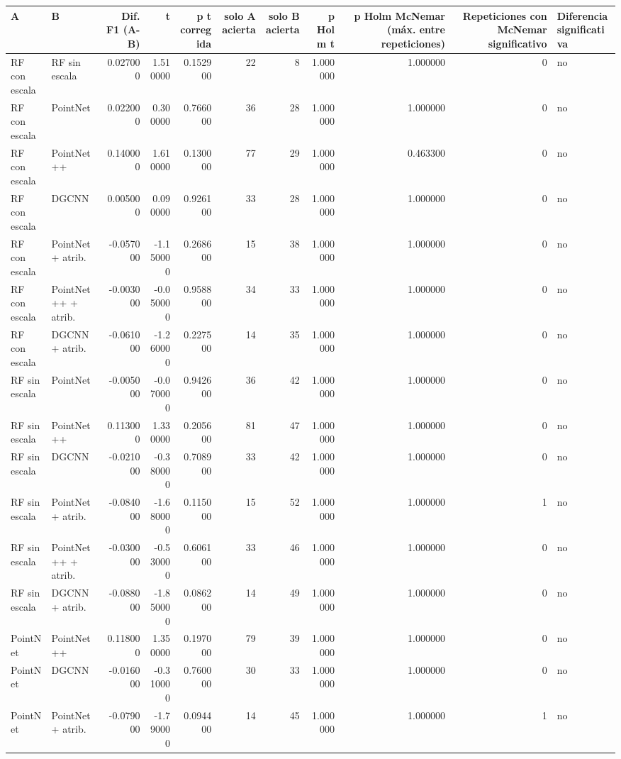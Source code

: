 \begin{tabular}{llrrrrrrrrl}
\toprule
A & B & Dif. F1 (A-B) & t & p t corregida & solo A acierta & solo B acierta & p Holm t & p Holm McNemar (máx. entre repeticiones) & Repeticiones con McNemar significativo & Diferencia significativa \\
\midrule
RF con escala & RF sin escala & 0.027000 & 1.510000 & 0.152900 & 22 & 8 & 1.000000 & 1.000000 & 0 & no \\
RF con escala & PointNet & 0.022000 & 0.300000 & 0.766000 & 36 & 28 & 1.000000 & 1.000000 & 0 & no \\
RF con escala & PointNet++ & 0.140000 & 1.610000 & 0.130000 & 77 & 29 & 1.000000 & 0.463300 & 0 & no \\
RF con escala & DGCNN & 0.005000 & 0.090000 & 0.926100 & 33 & 28 & 1.000000 & 1.000000 & 0 & no \\
RF con escala & PointNet + atrib. & -0.057000 & -1.150000 & 0.268600 & 15 & 38 & 1.000000 & 1.000000 & 0 & no \\
RF con escala & PointNet++ + atrib. & -0.003000 & -0.050000 & 0.958800 & 34 & 33 & 1.000000 & 1.000000 & 0 & no \\
RF con escala & DGCNN + atrib. & -0.061000 & -1.260000 & 0.227500 & 14 & 35 & 1.000000 & 1.000000 & 0 & no \\
RF sin escala & PointNet & -0.005000 & -0.070000 & 0.942600 & 36 & 42 & 1.000000 & 1.000000 & 0 & no \\
RF sin escala & PointNet++ & 0.113000 & 1.330000 & 0.205600 & 81 & 47 & 1.000000 & 1.000000 & 0 & no \\
RF sin escala & DGCNN & -0.021000 & -0.380000 & 0.708900 & 33 & 42 & 1.000000 & 1.000000 & 0 & no \\
RF sin escala & PointNet + atrib. & -0.084000 & -1.680000 & 0.115000 & 15 & 52 & 1.000000 & 1.000000 & 1 & no \\
RF sin escala & PointNet++ + atrib. & -0.030000 & -0.530000 & 0.606100 & 33 & 46 & 1.000000 & 1.000000 & 0 & no \\
RF sin escala & DGCNN + atrib. & -0.088000 & -1.850000 & 0.086200 & 14 & 49 & 1.000000 & 1.000000 & 0 & no \\
PointNet & PointNet++ & 0.118000 & 1.350000 & 0.197000 & 79 & 39 & 1.000000 & 1.000000 & 0 & no \\
PointNet & DGCNN & -0.016000 & -0.310000 & 0.760000 & 30 & 33 & 1.000000 & 1.000000 & 0 & no \\
PointNet & PointNet + atrib. & -0.079000 & -1.790000 & 0.094400 & 14 & 45 & 1.000000 & 1.000000 & 1 & no \\

\end{tabular}
